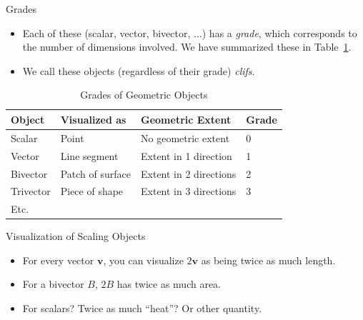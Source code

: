 \documentclass[aspectratio=169,xcolor=dvipsnames]{beamer}
\begin{document}
\begin{frame}{Grades}
\begin{itemize}
\item Each of these (scalar, vector, bivector, $\ldots$) has a \textit{grade}, which
      corresponds to the number of dimensions involved. We have summarized these
      in Table~\ref{Tab:Grades}.
\item We call these objects (regardless of their grade) \textit{clifs}.
\end{itemize}

\begin{table}
\caption{Grades of Geometric Objects}\label{Tab:Grades}
\begin{tabularx}{\textwidth}{p{2cm}p{3cm}p{5cm}l}
      \toprule {\bf Object} & {\bf Visualized as} & {\bf Geometric Extent} & \bf Grade\\
      \midrule
      Scalar & Point & No geometric extent & 0 \\
      Vector & Line segment & Extent in 1 direction & 1 \\
      Bivector & Patch of surface & Extent in 2 directions & 2 \\
      Trivector & Piece of shape & Extent in 3 directions & 3 \\
      Etc. & & &\\
      \bottomrule
\end{tabularx}
\end{table}

\end{frame}


\begin{frame}{Visualization of Scaling Objects}
\begin{itemize}
\item For every vector $\mathbf v$, you can visualize $2\mathbf v$ as being twice as
      much length. 
\item For a bivector $B$, $2B$ has twice as much area. 
\item For scalars? Twice as much ``heat''? Or other quantity.
\end{itemize}

\end{frame}

\end{document}
